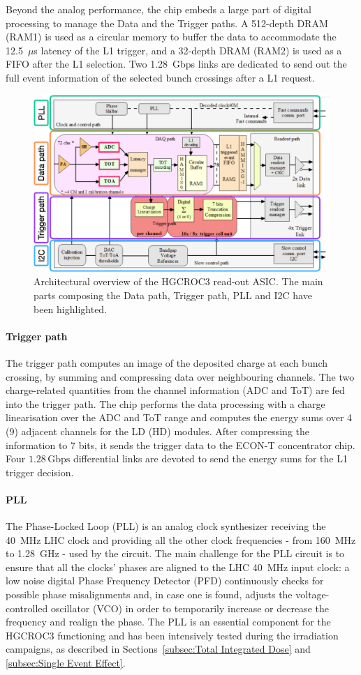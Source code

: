 Beyond the analog performance, the chip embeds a large part of digital processing to manage the Data and the Trigger paths. A 512-depth DRAM (RAM1) is used as a circular memory to buffer the data to accommodate the 12.5~$\mu$s latency of the L1 trigger, and a 32-depth DRAM (RAM2) is used as a FIFO after the L1 selection.
Two 1.28~Gbps links are dedicated to send out the full event information of the selected bunch crossings after a L1 request.

\begin{figure}
    \centering
    \includegraphics[width=0.75\linewidth]{Figures/HGCAL/Architecture.pdf}
    \caption{Architectural overview of the HGCROC3 read-out ASIC. The main parts composing the Data path, Trigger path, PLL and I2C have been highlighted.}
    \label{fig:Architecture}
\end{figure}

\paragraph{Trigger path}
The trigger path computes an image of the deposited charge at each bunch crossing, by summing and compressing data over neighbouring channels. The two charge-related quantities from the channel information (ADC and ToT) are fed into the trigger path. The chip performs the data processing with a charge linearisation over the ADC and ToT range and computes the energy sums over 4 (9) adjacent channels for the LD (HD) modules. After compressing the information to 7 bits, it sends the trigger data to the ECON-T concentrator chip.
Four $1.28\,\textrm{Gbps}$ differential links are devoted to send the energy sums for the L1 trigger decision.

\paragraph{PLL}
The Phase-Locked Loop (PLL) is an analog clock synthesizer receiving the 40~MHz LHC clock and providing all the other clock frequencies - from 160~MHz to 1.28~GHz - used by the circuit.
The main challenge for the PLL circuit is to ensure that all the clocks' phases are aligned to the LHC 40~MHz input clock: a low noise digital Phase Frequency Detector (PFD) continuously checks for possible phase misalignments and, in case one is found, adjusts the voltage-controlled oscillator (VCO) in order to temporarily increase or decrease the frequency and realign the phase. The PLL is an essential component for the HGCROC3 functioning and has been intensively tested during the irradiation campaigns, as described in Sections~\ref{subsec:Total Integrated Dose} and \ref{subsec:Single Event Effect}.

